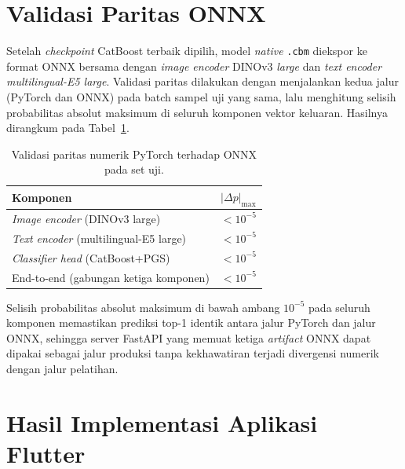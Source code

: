 \section{Validasi Paritas ONNX}
\label{sec:paritas-onnx}

Setelah \textit{checkpoint} CatBoost terbaik dipilih, model \textit{native} \texttt{.cbm} diekspor ke format ONNX bersama dengan \textit{image encoder} DINOv3 \textit{large} dan \textit{text encoder multilingual-E5 large}. Validasi paritas dilakukan dengan menjalankan kedua jalur (PyTorch dan ONNX) pada batch sampel uji yang sama, lalu menghitung selisih probabilitas absolut maksimum di seluruh komponen vektor keluaran. Hasilnya dirangkum pada Tabel~\ref{tab:paritas-onnx}.

\begin{table}[htbp]
\centering
\caption{Validasi paritas numerik PyTorch terhadap ONNX pada set uji.}
\label{tab:paritas-onnx}
\begin{tabular}{l c}
\toprule
\textbf{Komponen} & \textbf{$|\Delta p|_{\max}$} \\
\midrule
\textit{Image encoder} (DINOv3 large) & $< 10^{-5}$ \\
\textit{Text encoder} (multilingual-E5 large) & $< 10^{-5}$ \\
\textit{Classifier head} (CatBoost+PGS) & $< 10^{-5}$ \\
End-to-end (gabungan ketiga komponen) & $< 10^{-5}$ \\
\bottomrule
\end{tabular}
\end{table}

Selisih probabilitas absolut maksimum di bawah ambang $10^{-5}$ pada seluruh komponen memastikan prediksi top-1 identik antara jalur PyTorch dan jalur ONNX, sehingga server FastAPI yang memuat ketiga \textit{artifact} ONNX dapat dipakai sebagai jalur produksi tanpa kekhawatiran terjadi divergensi numerik dengan jalur pelatihan.

\section{Hasil Implementasi Aplikasi Flutter}
\label{sec:hasil-flutter}

